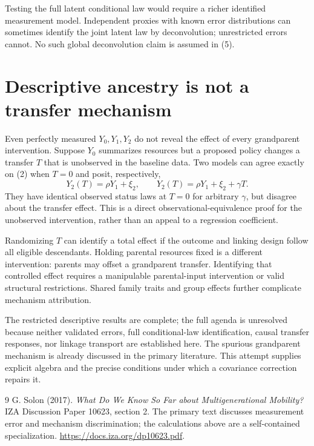 \documentclass[11pt,a4paper]{article}
\begin{document}
Testing the full latent conditional law would require a richer identified measurement model. Independent proxies with known error distributions can sometimes identify the joint latent law by deconvolution; unrestricted errors cannot. No such global deconvolution claim is assumed in (5).
\section{Descriptive ancestry is not a transfer mechanism}
Even perfectly measured $Y_0,Y_1,Y_2$ do not reveal the effect of every grandparent intervention. Suppose $Y_0$ summarizes resources but a proposed policy changes a transfer $T$ that is unobserved in the baseline data. Two models can agree exactly on (2) when $T=0$ and posit, respectively,
\[
 Y_2(T)=\rho Y_1+\xi_2,\qquad
 Y_2(T)=\rho Y_1+\xi_2+\gamma T.
\]
They have identical observed status laws at $T=0$ for arbitrary $\gamma$, but disagree about the transfer effect. This is a direct observational-equivalence proof for the unobserved intervention, rather than an appeal to a regression coefficient.

Randomizing $T$ can identify a total effect if the outcome and linking design follow all eligible descendants. Holding parental resources fixed is a different intervention: parents may offset a grandparent transfer. Identifying that controlled effect requires a manipulable parental-input intervention or valid structural restrictions. Shared family traits and group effects further complicate mechanism attribution.

The restricted descriptive results are complete; the full agenda is unresolved because neither validated errors, full conditional-law identification, causal transfer responses, nor linkage transport are established here. The spurious grandparent mechanism is already discussed in the primary literature. This attempt supplies explicit algebra and the precise conditions under which a covariance correction repairs it.
\begin{thebibliography}{9}
 G. Solon (2017). \emph{What Do We Know So Far about Multigenerational Mobility?} IZA Discussion Paper 10623, section 2.
The primary text discusses measurement error and mechanism discrimination; the calculations above are a self-contained specialization.
\url{https://docs.iza.org/dp10623.pdf}.
\end{thebibliography}
\end{document}
